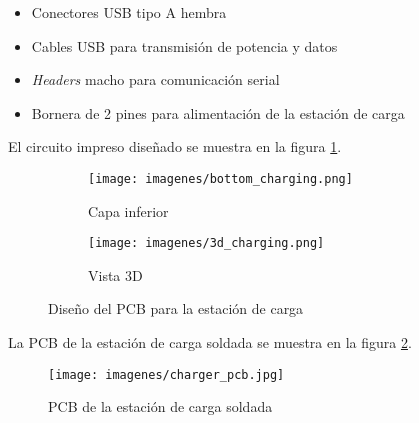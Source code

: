 \begin{itemize}
    \item Conectores USB tipo A hembra
    \item Cables USB para transmisión de potencia y datos
    \item \textit{Headers} macho para comunicación serial
    \item Bornera de 2 pines para alimentación de la estación de carga
\end{itemize}
El circuito impreso diseñado se muestra en la figura \ref{fig:pcb_estacion_carga}.

\begin{figure}[H]
    \centering
    \begin{subfigure}{0.9\linewidth}
        \centering
        \texttt{[image: imagenes/bottom\_charging.png]}
        \caption{Capa inferior}
    \end{subfigure}
    \vfill
    \begin{subfigure}{0.9\linewidth}
        \centering
        \texttt{[image: imagenes/3d\_charging.png]}
        \caption{Vista 3D}
    \end{subfigure}
    \caption{Diseño del PCB para la estación de carga}
    \label{fig:pcb_estacion_carga}
\end{figure}

La PCB de la estación de carga soldada se muestra en la figura \ref{fig:pcb_estacion_carga_soldada}.

\begin{figure}[H]
    \centering
    \texttt{[image: imagenes/charger\_pcb.jpg]}
    \caption{PCB de la estación de carga soldada}
    \label{fig:pcb_estacion_carga_soldada}
\end{figure}